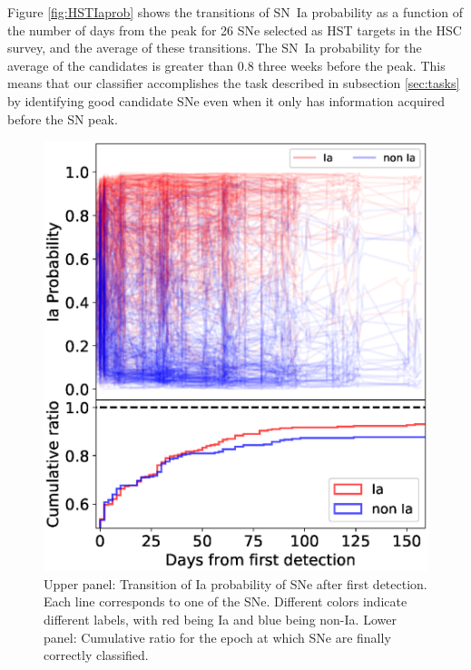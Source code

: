 \documentclass[useamsfonts]{pasj01}
\begin{document}
%
Figure \ref{fig:HSTIaprob} shows the transitions of SN~Ia probability as a function of the number of days from the peak for 26 SNe selected as HST targets in the HSC survey, and the average of these transitions.
The SN~Ia probability for the average of the candidates is greater than 0.8 three weeks before the peak.
This means that our classifier accomplishes the task described in subsection \ref{sec:tasks} by identifying good candidate SNe even when it only has information acquired before the SN peak.
%
\begin{figure}[htbp]
  \begin{center}
     \includegraphics[width=\columnwidth]{figures/n_observations_lastestday_200709.eps}
  \end{center}
  \caption{%
  Upper panel: Transition of Ia probability of SNe after first detection. Each line corresponds to one of the SNe. Different colors indicate different labels, with red being Ia and blue being non-Ia. Lower panel: Cumulative ratio for the epoch at which SNe are finally correctly classified.
  }%
  \label{fig:visualized_Ia_prob}
\end{figure}
\end{document}
